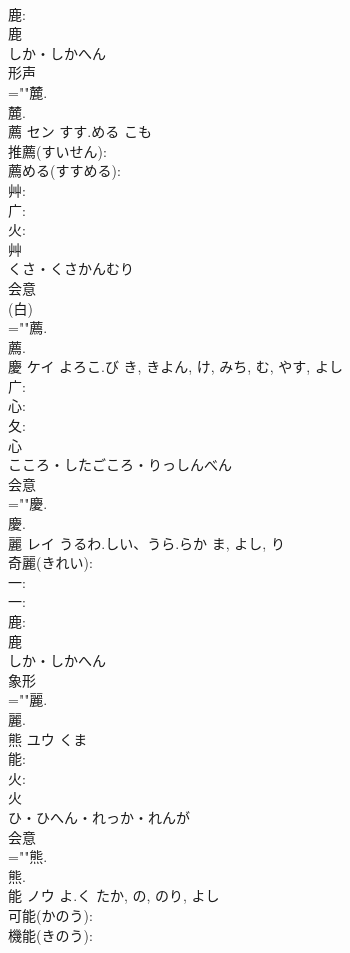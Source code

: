 \documentclass[8pt]{extreport}
\begin{document}
\begin{CJK}{UTF8}{min}
\\	鹿: 
\\	鹿	
\\	しか・しかへん	
\\	形声 
\\	=""麓.
\\	麓.
\\	薦	セン	すす.める	こも	
\\	推薦(すいせん): 
\\	薦める(すすめる): 
\\	艸: 
\\	广: 
\\	火: 
\\	艸	
\\	くさ・くさかんむり	
\\	会意 
\\	(白) 
\\	=""薦.
\\	薦.
\\	慶	ケイ	よろこ.び	き, きよん, け, みち, む, やす, よし	
\\	广: 
\\	心: 
\\	夂: 
\\	心	
\\	こころ・したごころ・りっしんべん	
\\	会意 
\\	=""慶.
\\	慶.
\\	麗	レイ	うるわ.しい、うら.らか	ま, よし, り	
\\	奇麗(きれい): 
\\	一: 
\\	一: 
\\	鹿: 
\\	鹿	
\\	しか・しかへん	
\\	象形 
\\	=""麗.
\\	麗.
\\	熊	ユウ	くま		
\\	能: 
\\	火: 
\\	火	
\\	ひ・ひへん・れっか・れんが	
\\	会意 
\\	=""熊.
\\	熊.
\\	能	ノウ	よ.く	たか, の, のり, よし	
\\	可能(かのう): 
\\	機能(きのう): 

\end{CJK}
\end{document}
